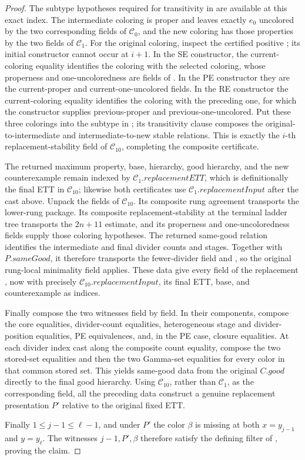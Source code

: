 \begin{proof}
The subtype hypotheses required for transitivity in  are
available at this exact index.  The intermediate coloring is proper and
leaves exactly \(e_0\) uncolored by the two corresponding fields of
\(\mathcal C_0\), and the new coloring has those properties by the two
fields of \(\mathcal C_1\).  For the original coloring, inspect the
certified positive ; its initial constructor
cannot occur at \(i+1\).  In the SE constructor, the current-coloring
equality identifies the coloring with the selected coloring, whose
properness and one-uncoloredness are fields of
.  In the PE constructor they are the
current-proper and current-one-uncolored fields.  In the RE constructor
the current-coloring equality identifies the coloring with the preceding
one, for which the constructor supplies previous-proper and
previous-one-uncolored.  Put these three colorings into the subtype in
; its transitivity clause composes the original-to-intermediate
and intermediate-to-new stable relations.  This is exactly the
\(i\)-th replacement-stability field of \(\mathcal C_{10}\), completing
the composite certificate.

The returned maximum property, base, hierarchy, good hierarchy, and the
new counterexample remain indexed by
\(\mathcal C_1.\mathit{replacementETT}\), which is definitionally the final
ETT in \(\mathcal C_{10}\); likewise both certificates use
\(\mathcal C_1.\mathit{replacementInput}\) after the cast above.  Unpack
the fields of \(\mathcal C_{10}\).  Its composite rung agreement
transports the lower-rung package.  Its composite replacement-stability
at the terminal ladder tree transports the \(2n+11\) estimate, and its
properness and one-uncoloredness fields supply those coloring hypotheses.
The returned same-good relation identifies the intermediate and final
divider counts and stages.  Together with \(P.\mathit{sameGood}\), it
therefore transports the fewer-divider field and
, so the original rung-local
minimality field applies.  These data give every field of the replacement
, now with precisely
\(\mathcal C_{10}.\mathit{replacementInput}\), its final ETT, base, and
counterexample as indices.

Finally compose the two  witnesses field by
field.  In their  components, compose the
core equalities, divider-count equalities, heterogeneous stage and
divider-position equalities, PE equivalences, and, in the PE case, closure
equalities.  At each divider index cast along the composite count equality,
compose the two stored-set equalities and then the two Gamma-set
equalities for every color in that common stored set.  This yields
same-good data from the original \(C.\mathit{good}\) directly to the final
good hierarchy.  Using \(\mathcal C_{10}\), rather than \(\mathcal C_1\),
as the corresponding field, all the preceding data construct a genuine
replacement presentation \(P'\) relative to the original fixed ETT.

Finally \(1\le j-1\le\ell-1\), and under \(P'\) the color \(\beta\) is
missing at both \(x=y_{j-1}\) and \(y=y_\ell\).  The witnesses
\(j-1,P',\beta\) therefore satisfy the defining filter of
, proving the claim.
\end{proof}
